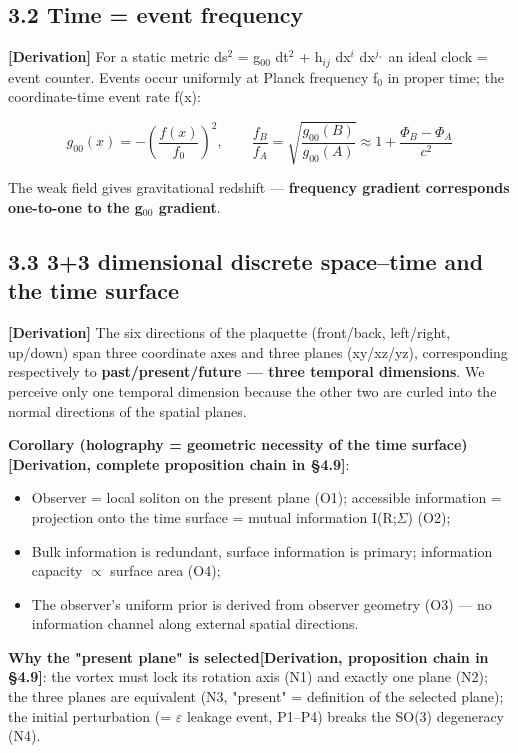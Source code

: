 \documentclass[12pt]{article}
\newcommand{\mtag}[1]{\textbf{[#1]}}
\newcommand{\up}[1]{\ensuremath{^{#1}}}
\newcommand{\down}[1]{\ensuremath{_{#1}}}
\begin{document}
\subsection{3.2 Time = event frequency}

\mtag{Derivation} For a static metric ds\up{2} = g\down{00} dt\up{2} + h\down{ij} dx\up{i} dx\up{j,} an ideal clock = event counter. Events occur uniformly at Planck frequency f\down{0} in proper time; the coordinate-time event rate f(x):

\[g_{00}(x) = -\left(\frac{f(x)}{f_0}\right)^2,\qquad \frac{f_B}{f_A} = \sqrt{\frac{g_{00}(B)}{g_{00}(A)}} \approx 1 + \frac{\Phi_B - \Phi_A}{c^2}\]

The weak field gives gravitational redshift --- \textbf{frequency gradient corresponds one-to-one to the g\down{00} gradient}.

\subsection{3.3 3+3 dimensional discrete space--time and the time surface}

\mtag{Derivation} The six directions of the plaquette (front/back, left/right, up/down) span three coordinate axes and three planes (xy/xz/yz), corresponding respectively to \textbf{past/present/future --- three temporal dimensions}. We perceive only one temporal dimension because the other two are curled into the normal directions of the spatial planes.

\textbf{Corollary (holography = geometric necessity of the time surface)}\mtag{Derivation, complete proposition chain in \S{}4.9}:
\begin{itemize}
\item Observer = local soliton on the present plane (O1); accessible information = projection onto the time surface = mutual information I(R;\ensuremath{\Sigma}) (O2);
\item Bulk information is redundant, surface information is primary; information capacity \ensuremath{\propto} surface area (O4);
\item The observer's uniform prior is derived from observer geometry (O3) --- no information channel along external spatial directions.
\end{itemize}

\textbf{Why the "present plane" is selected}\mtag{Derivation, proposition chain in \S{}4.9}: the vortex must lock its rotation axis (N1) and exactly one plane (N2); the three planes are equivalent (N3, "present" = definition of the selected plane); the initial perturbation (= \ensuremath{\varepsilon} leakage event, P1--P4) breaks the SO(3) degeneracy (N4).
\end{document}
